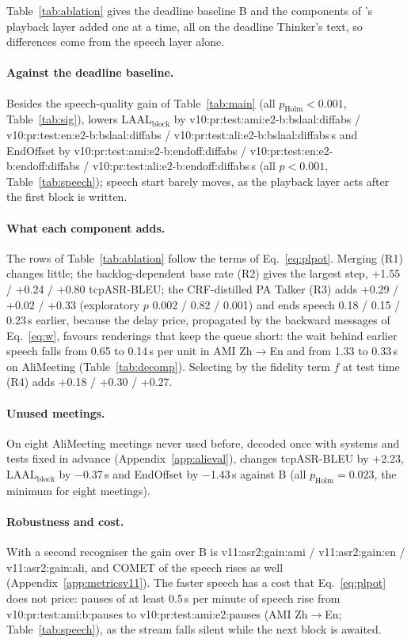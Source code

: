 Table~\ref{tab:ablation} gives the deadline baseline B and the components of \sys{}'s playback layer added one at a
time, all on the deadline Thinker's text, so differences come from the speech layer alone.

\paragraph{Against the deadline baseline.} Besides the speech-quality gain of Table~\ref{tab:main} (all
$p_\text{Holm}<0.001$, Table~\ref{tab:sig}), \sys{} lowers LAAL$_\text{block}$ by
\num{v10:pr:test:ami:e2-b:bslaal:diffabs} / \num{v10:pr:test:en:e2-b:bslaal:diffabs} /
\num{v10:pr:test:ali:e2-b:bslaal:diffabs}\,s and EndOffset by \num{v10:pr:test:ami:e2-b:endoff:diffabs} /
\num{v10:pr:test:en:e2-b:endoff:diffabs} / \num{v10:pr:test:ali:e2-b:endoff:diffabs}\,s (all $p<0.001$,
Table~\ref{tab:speech}); speech start barely moves, as the playback layer acts after the first block is written.

\paragraph{What each component adds.} The rows of Table~\ref{tab:ablation} follow the terms of Eq.~\eqref{eq:plpot}.
Merging (R1) changes little; the backlog-dependent base rate (R2) gives the largest step, +1.55 / +0.24 / +0.80
tcpASR-BLEU; the CRF-distilled PA Talker (R3) adds +0.29 / +0.02 / +0.33 (exploratory $p$ 0.002 / 0.82 / 0.001) and
ends speech 0.18 / 0.15 / 0.23\,s earlier, because the delay price, propagated by the backward messages of
Eq.~\eqref{eq:w}, favours renderings that keep the queue short: the wait behind earlier speech falls from 0.65 to
0.14\,s per unit in AMI Zh$\rightarrow$En and from 1.33 to 0.33\,s on AliMeeting (Table~\ref{tab:decomp}). Selecting
by the fidelity term $f$ at test time (R4) adds +0.18 / +0.30 / +0.27.

\ifAliEval
\paragraph{Unused meetings.}
\label{sec:res-alieval}
On eight AliMeeting meetings never used before, decoded once with systems and tests fixed in advance
(Appendix~\ref{app:alieval}), \sys{} changes tcpASR-BLEU by +2.23, LAAL$_\text{block}$ by $-$0.37\,s and EndOffset by
$-$1.43\,s against B (all $p_\text{Holm}=0.023$, the minimum for eight meetings).
\fi

\paragraph{Robustness and cost.}\ifMetricsV{} With a second recogniser the gain over B is
\num{v11:asr2:gain:ami} / \num{v11:asr2:gain:en} / \num{v11:asr2:gain:ali}, and COMET of the speech rises as well
(Appendix~\ref{app:metricsv11}).\fi{} The faster speech has a cost that Eq.~\eqref{eq:plpot} does not price: pauses of
at least 0.5\,s per minute of speech rise from \num{v10:pr:test:ami:b:pauses} to \num{v10:pr:test:ami:e2:pauses}
(AMI Zh$\rightarrow$En; Table~\ref{tab:speech}), as the stream falls silent while the next block is awaited.
